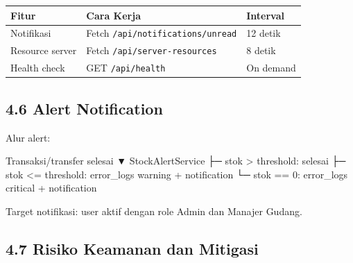 \documentclass[
]{article}
\newenvironment{Shaded}{}{}
\newcommand{\NormalTok}[1]{#1}
\begin{document}
\begin{longtable}[]{@{}P{0.24\textwidth}P{0.58\textwidth}C{0.12\textwidth}@{}}
\toprule\noalign{}
Fitur & Cara Kerja & Interval \\
\midrule\noalign{}
\endhead
\bottomrule\noalign{}
\endlastfoot
Notifikasi & Fetch \texttt{/api/notifications/unread} & 12 detik \\
Resource server & Fetch \texttt{/api/server-resources} & 8 detik \\
Health check & GET \texttt{/api/health} & On demand \\
\end{longtable}

\subsection{4.6 Alert Notification}\label{46-alert-notification}

Alur alert:

\begin{Shaded}
\begin{Highlighting}[]
\NormalTok{Transaksi/transfer selesai}
\NormalTok{  ▼}
\NormalTok{StockAlertService}
\NormalTok{  ├─ stok \textgreater{} threshold: selesai}
\NormalTok{  ├─ stok \textless{}= threshold: error\_logs warning + notification}
\NormalTok{  └─ stok == 0: error\_logs critical + notification}
\end{Highlighting}
\end{Shaded}

Target notifikasi: user aktif dengan role Admin dan Manajer Gudang.

\subsection{4.7 Risiko Keamanan dan
Mitigasi}\label{47-risiko-keamanan-dan-mitigasi}
\end{document}
